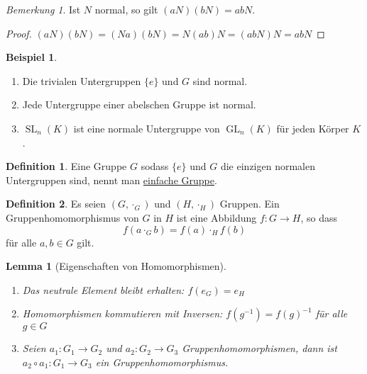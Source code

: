 \documentclass[12pt]{scrartcl} %
\DeclareMathOperator{\GL}{GL}
\DeclareMathOperator{\SL}{SL}
\newtheorem{lemma}{Lemma}
\theoremstyle{definition}
\newtheorem*{defn}{Definition}
\newtheorem{ex}{Beispiel}
\theoremstyle{remark}
\newtheorem*{nb}{Bemerkung}
\newcommand{\defi}{\underline}
\begin{document}
\begin{nb}
	Ist $N$ normal, so gilt $(aN)(bN)=abN$.
\end{nb}

\begin{proof}
	$(aN)(bN)=(Na)(bN)=N(ab)N=(abN)N=abN$
\end{proof}

\begin{ex}
	\begin{enumerate}
	\item Die trivialen Untergruppen $\{e\}$ und $G$ sind normal.
	\item Jede Untergruppe einer abelschen Gruppe ist normal.
	\item $\SL_n(K)$ ist eine normale Untergruppe von $\GL_n(K)$ für jeden Körper $K$.
	\end{enumerate}
\end{ex}

\begin{defn}
	Eine Gruppe $G$ sodass $\{e\}$ und $G$ die einzigen normalen Untergruppen sind, nennt man \defi{einfache Gruppe}.
\end{defn}

\begin{defn}
	Es seien $(G,\cdot_G)$ und $(H,\cdot_H)$ Gruppen.
	Ein Gruppenhomomorphismus von $G$ in $H$ ist eine Abbildung $f:G\rightarrow H$, so dass	$$f(a\cdot_{G}b)=f(a)\cdot_{H}f(b)$$ für alle $a,b\in G$ gilt.
\end{defn}

\begin{lemma}[Eigenschaften von Homomorphismen]
	\begin{enumerate}
	\item Das neutrale Element bleibt erhalten: $f(e_G)=e_H$
	\item Homomorphismen kommutieren mit Inversen: $f(g^{-1})=f(g)^{-1}$ für alle $g\in G$
	\item Seien $a_1: G_1\rightarrow G_2$ und $a_2: G_2\rightarrow G_3$ Gruppenhomomorphismen, dann ist $a_2\circ a_1: G_1\rightarrow G_3$ ein Gruppenhomomorphismus.
	\end{enumerate}
\end{lemma}
\end{document}
